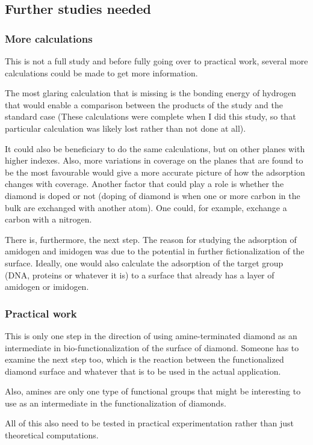 \documentclass[10pt,a4paper]{article}
\begin{document}
\subsection{Further studies needed}
\subsubsection{More calculations}
This is not a full study and before fully going over to practical work, several more calculations could be made to get more information. 

The most glaring calculation that is missing is the bonding energy of hydrogen that would enable a comparison between the products of the study and the standard case (These calculations were complete when I did this study, so that particular calculation was likely lost rather than not done at all). 

It could also be beneficiary to do the same calculations, but on other planes with higher indexes. Also, more variations in coverage on the planes that are found to be the most favourable would give a more accurate picture of how the adsorption changes with coverage. Another factor that could play a role is whether the diamond is doped or not (doping of diamond is when one or more carbon in the bulk are exchanged with another atom). One could, for example, exchange a carbon with a nitrogen.

There is, furthermore, the next step. The reason for studying the adsorption of amidogen and imidogen was due to the potential in further fictionalization of the surface. Ideally, one would also calculate the adsorption of the target group (DNA, proteins or whatever it is) to a surface that already has a layer of amidogen or imidogen.

\subsubsection{Practical work}
This is only one step in the direction of using amine-terminated diamond as an intermediate in bio-functionalization of the surface of diamond. Someone has to examine the next step too, which is the reaction between the functionalized diamond surface and whatever that is to be used in the actual application. 

Also, amines are only one type of functional groups that might be interesting to use as an intermediate in the functionalization of diamonds. 


All of this also need to be tested in practical experimentation rather than just theoretical computations.
\end{document}
